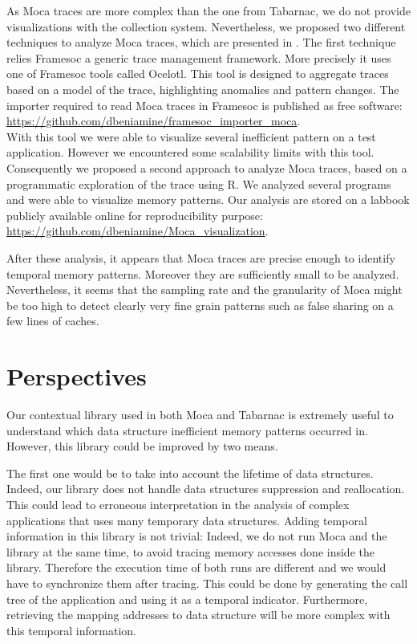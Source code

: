 As \gls{Moca} traces are more complex than the one from \gls{Tabarnac}, we do not provide visualizations with the collection system.
Nevertheless, we proposed two different techniques to analyze \gls{Moca} traces, which are presented in .
The first technique relies \gls{Framesoc} a generic trace management framework.
More precisely it uses one of \gls{Framesoc} tools called \gls{Ocelotl}.
This tool is designed to aggregate traces based on a model of the trace, highlighting anomalies and pattern changes.
The importer required to read \gls{Moca} traces in \gls{Framesoc} is published as free software:\\
\url{https://github.com/dbeniamine/framesoc\_importer\_moca}.\\
With this tool we were able to visualize several inefficient pattern on a test application.
However we encountered some scalability limits with this tool.
Consequently we proposed a second approach to analyze \gls{Moca} traces, based on a programmatic exploration of the trace using \gls{R}.
We analyzed several programs and were able to visualize memory patterns.
Our analysis are stored on a labbook publicly available online for reproducibility purpose:\\
\url{https://github.com/dbeniamine/Moca_visualization}.

After these analysis, it appears that \gls{Moca} traces are precise enough to identify temporal memory patterns.
Moreover they are sufficiently small to be analyzed.
Nevertheless, it seems that the sampling rate and the granularity of \gls{Moca} might be too high to detect clearly very fine grain patterns such as false sharing on a few lines of caches.


\section{Perspectives}

Our contextual library used in both \gls{Moca} and \gls{Tabarnac} is extremely useful to understand which data structure inefficient memory patterns occurred in.
However, this library could be improved by two means.

The first one would be to take into account the lifetime of data structures.
Indeed, our library does not handle data structures suppression and reallocation.
This could lead to erroneous interpretation in the analysis of complex applications that uses many temporary data structures.
Adding temporal information in this library is not trivial:
Indeed, we do not run \gls{Moca} and the library at the same time, to avoid tracing memory accesses done inside the library.
Therefore the execution time of both runs are different and we would have to synchronize them after tracing.
This could be done by generating the call tree of the application and using it as a temporal indicator.
Furthermore, retrieving the mapping addresses to data structure will be more complex with this temporal information.

